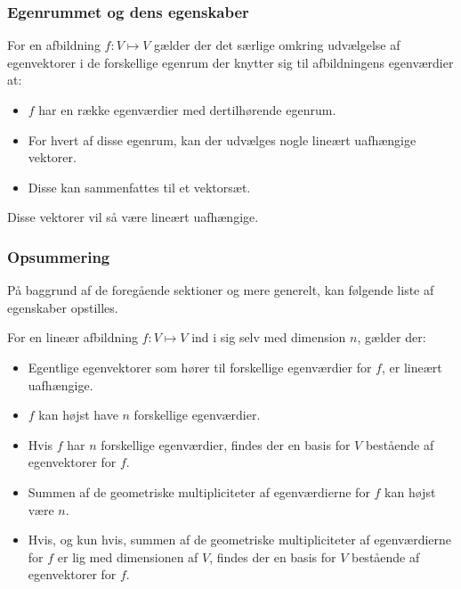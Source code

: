 \documentclass{article}
\begin{document}
	\subsubsection{Egenrummet og dens egenskaber}
	For en afbildning $f : V \mapsto V$ gælder der det særlige omkring udvælgelse af egenvektorer i de forskellige egenrum der knytter sig til afbildningens egenværdier at:
	\begin{itemize}
		\item $f$ har en række egenværdier med dertilhørende egenrum.
		\item For hvert af disse egenrum, kan der udvælges nogle lineært uafhængige vektorer.
		\item Disse kan sammenfattes til et vektorsæt.
	\end{itemize}
	Disse vektorer vil så være lineært uafhængige.
	
	\subsubsection{Opsummering}
	På baggrund af de foregående sektioner og mere generelt, kan følgende liste af egenskaber opstilles.\newline
	
	For en lineær afbildning $f : V \mapsto V$ ind i sig selv med dimension $n$, gælder der:
	\begin{itemize}
		\item Egentlige egenvektorer som hører til forskellige egenværdier for $f$, er lineært uafhængige.
		\item $f$ kan højst have $n$ forskellige egenværdier.
		\item Hvis $f$ har $n$ forskellige egenværdier, findes der en basis for $V$ bestående af egenvektorer for $f$.
		\item Summen af de geometriske multipliciteter af egenværdierne for $f$ kan højst være $n$.
		\item 	Hvis, og kun hvis, summen af de geometriske multipliciteter af egenværdierne for $f$ er lig med dimensionen af $V$, findes der en basis for $V$ bestående af egenvektorer for $f$.
	\end{itemize}
	
\end{document}
